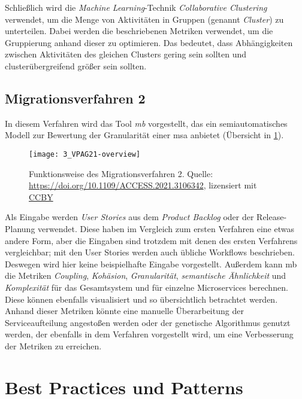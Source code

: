 Schließlich wird die \emph{Machine Learning}-Technik \emph{Collaborative Clustering} verwendet, um die Menge von Aktivitäten in Gruppen (genannt \emph{Cluster}) zu unterteilen.
Dabei werden die beschriebenen Metriken verwendet, um die Gruppierung anhand dieser zu optimieren.
Das bedeutet, dass Abhängigkeiten zwischen Aktivitäten des gleichen Clusters gering sein sollten und clusterübergreifend größer sein sollten.

\subsection{Migrationsverfahren 2}

In diesem Verfahren wird das Tool \emph{\acrfull{mb}} vorgestellt, das ein semiautomatisches Modell zur Bewertung der Granularität einer \gls{msa} anbietet (Übersicht in \cref{fig:interviews-migrationsverfahren2}).

\begin{figure}[!ht]
	\centering
	\texttt{[image: 3\_VPAG21-overview]}
	\caption[Funktionsweise Migrationsverfahren 2]{
		Funktionsweise des Migrationsverfahren 2. Quelle: \url{https://doi.org/10.1109/ACCESS.2021.3106342}, lizensiert mit \hyperref{https://creativecommons.org/licenses/by/4.0/}{}{}{CCBY} 
	}
	\label{fig:interviews-migrationsverfahren2}
\end{figure}

Als Eingabe werden \emph{User Stories} aus dem \emph{Product Backlog} oder der Release-Planung verwendet.
Diese haben im Vergleich zum ersten Verfahren eine etwas andere Form, aber die Eingaben sind trotzdem mit denen des ersten Verfahrens vergleichbar; mit den User Stories werden auch übliche Workflows beschrieben.
Deswegen wird hier keine beispielhafte Eingabe vorgestellt.
Außerdem kann \gls{mb} die Metriken  \emph{Coupling}, \emph{Kohäsion}, \emph{Granularität}, \emph{semantische Ähnlichkeit} und \emph{Komplexität} für das Gesamtsystem und für einzelne Microservices berechnen. 
Diese können ebenfalls visualisiert und so übersichtlich betrachtet werden.
Anhand dieser Metriken könnte eine manuelle Überarbeitung der Serviceaufteilung angestoßen werden oder der genetische Algorithmus genutzt werden, der ebenfalls in dem Verfahren vorgestellt wird, um eine Verbesserung der Metriken zu erreichen. 

\section{Best Practices und Patterns}

